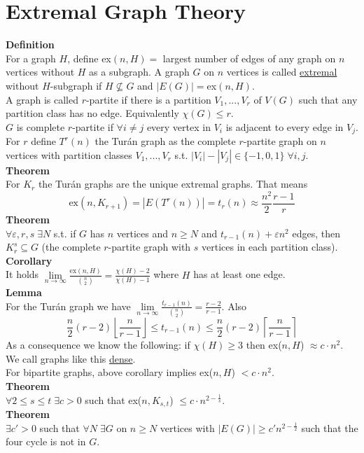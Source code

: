 \documentclass[a4paper, 12pt]{article}
\begin{document}
	\section{Extremal Graph Theory}
	\textbf{Definition}\\
	For a graph $H$, define ex$(n,H) =$ largest number of edges of any graph on $n$ vertices without $H$ as a subgraph. A graph $G$ on $n$ vertices is called \underline{extremal} without $H$-subgraph if $H\not \subseteq G$ and $\left|E(G)\right| = $ex$(n,H)$.\\
	A graph is called $r$-partite if there is a partition $V_1,...,V_r$ of $V(G)$ such that any partition class has no edge. Equivalently $\chi(G) \leq r$.\\
	$G$ is complete $r$-partite if $\forall i \neq j$ every vertex in $V_i$ is adjacent to every edge in $V_j$. For $r$ define $T^r(n)$ the Turán graph as the complete $r$-partite graph on $n$ vertices with partition classes $V_1,...,V_r$ s.t. $\left|V_i\right| - \left|V_j\right| \in \{-1,0,1\} \; \forall i,j$.\\
	\textbf{Theorem}\\
	For $K_r$ the Turán graphs are the unique extremal graphs. That means \[\text{ex}(n,K_{r+1}) = \left|E(T^r(n))\right| = t_r(n) \approx \frac{n^2}{2} \frac{r-1}{r}\]
	\textbf{Theorem}\\
	$\forall \varepsilon,r,s \; \exists N$ s.t. if $G$ has $n$ vertices and $n \geq N$ and $t_{r-1}(n) + \varepsilon n^2$ edges, then $K_r^s \subseteq G$ (the complete $r$-partite graph with $s$ vertices in each partition class).\\
	\textbf{Corollary}\\
	It holds $\lim\limits_{n \to \infty} \frac{\text{ex}(n,H)}{\binom{n}{2}} = \frac{\chi(H)-2}{\chi(H)-1}$ where $H$ has at least one edge.\\
	\textbf{Lemma}\\
	For the Turán graph we have $\lim\limits_{n \to \infty} \frac{t_{r-1}(n)}{\binom{n}{2}} = \frac{r-2}{r-1}$. Also \[\frac{n}{2} (r-2) \left\lfloor\frac{n}{r-1}\right\rfloor \leq t_{r-1}(n) \leq \frac{n}{2} (r-2) \left\lceil\frac{n}{r-1}\right\rceil\]
	As a consequence we know the following: if $\chi(H) \geq 3$ then ex($n,H$) $\approx c\cdot n^2$. We call graphs like this \underline{dense}.\\
	For bipartite graphs, above corollary implies ex($n,H$) $< c\cdot n^2$.\\
	\textbf{Theorem}\\
	$\forall 2 \leq s \leq t \; \exists c > 0$ such that ex($n,K_{s,t}$) $\leq c\cdot n^{2-\frac{1}{s}}$.\\
	\textbf{Theorem}\\
	$\exists c'>0$ such that $\forall N \; \exists G$ on $n \geq N$ vertices with $\left|E(G)\right| \geq c'n^{2-\frac{1}{2}}$ such that the four cycle is not in $G$.\\
	
\end{document}
